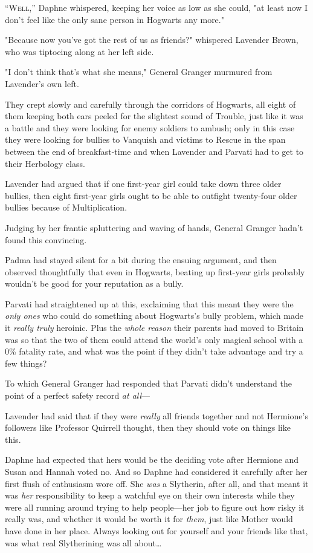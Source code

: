 
\lettrine{“W}{ell},'' Daphne 
whispered, keeping her voice as low as she could, "at least now I don't feel 
like the only sane person in Hogwarts any more."

"Because now you've got the rest of us as friends?" whispered Lavender Brown, 
who was tiptoeing along at her left side.

"I don't think that's what she means," General Granger murmured from Lavender's 
own left.

They crept slowly and carefully through the corridors of Hogwarts, all eight of 
them keeping both ears peeled for the slightest sound of Trouble, just like it 
was a battle and they were looking for enemy soldiers to ambush; only in this 
case they were looking for bullies to Vanquish and victims to Rescue in the 
span between the end of breakfast-time and when Lavender and Parvati had to get 
to their Herbology class.

Lavender had argued that if one first-year girl could take down three older 
bullies, then eight first-year girls ought to be able to outfight twenty-four 
older bullies because of Multiplication.

Judging by her frantic spluttering and waving of hands, General Granger hadn't 
found this convincing.

Padma had stayed silent for a bit during the ensuing argument, and then 
observed thoughtfully that even in Hogwarts, beating up first-year girls 
probably wouldn't be good for your reputation as a bully.

Parvati had straightened up at this, exclaiming that this meant they were the 
\emph{only ones} who could do something about Hogwarts's bully problem, which 
made it \emph{really truly} heroinic. Plus the \emph{whole reason} their 
parents had moved to Britain was so that the two of them could attend the 
world's only magical school with a 0\% fatality rate, and what was the point if 
they didn't take advantage and try a few things?

To which General Granger had responded that Parvati didn't understand the point 
of a perfect safety record \emph{at all}---

Lavender had said that if they were \emph{really} all friends together and not 
Hermione's followers like Professor Quirrell thought, then they should vote on 
things like this.

Daphne had expected that hers would be the deciding vote after Hermione and 
Susan and Hannah voted no. And so Daphne had considered it carefully after her 
first flush of enthusiasm wore off. She \emph{was} a Slytherin, after all, and 
that meant it was \emph{her} responsibility to keep a watchful eye on their own 
interests while they were all running around trying to help people---her job to 
figure out how risky it really was, and whether it would be worth it for 
\emph{them}, just like Mother would have done in her place. Always looking out 
for yourself and your friends like that, was what real Slytherining was all 
about{\ldots}

